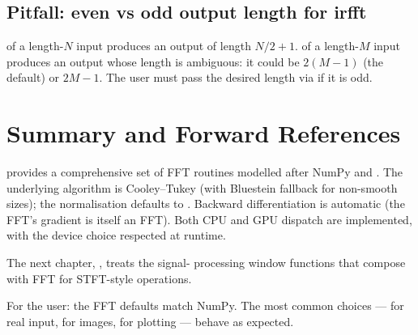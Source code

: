 \subsection{Pitfall: even vs odd output length for irfft}
\label{ssec:fft:irfft_length}

 of a length-$N$ input produces an output of length
$N/2 + 1$.  of a length-$M$ input produces an
output whose length is ambiguous: it could be $2(M-1)$ (the
default) or $2M - 1$. The user must pass the desired length via
 if it is odd.

\section{Summary and Forward References}
\label{sec:fft:summary}

 provides a comprehensive set of FFT routines
modelled after NumPy and . The underlying algorithm
is Cooley--Tukey (with Bluestein fallback for non-smooth sizes);
the normalisation defaults to . Backward
differentiation is automatic (the FFT's gradient is itself an
FFT). Both CPU and GPU dispatch are implemented, with the device
choice respected at runtime.

The next chapter, , treats the signal-
processing window functions that compose with FFT for STFT-style
operations.

\begin{lucidnote}
For the user: the FFT defaults match NumPy. The most common
choices ---  for real input,  for images,
 for plotting --- behave as expected.
\end{lucidnote}
